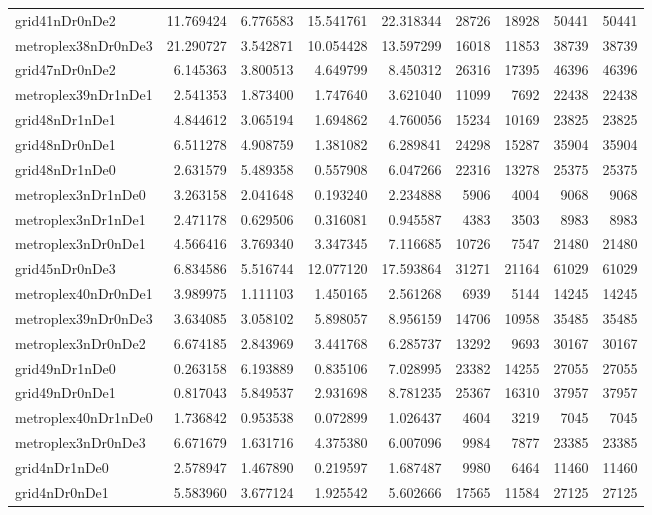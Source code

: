 \begin{longtable}{|l|r|r|r|r|r|r|r|r|}
grid41nDr0nDe2 & 11.769424 & 6.776583 & 15.541761 & 22.318344 & 28726 & 18928 & 50441 & 50441 \\
metroplex38nDr0nDe3 & 21.290727 & 3.542871 & 10.054428 & 13.597299 & 16018 & 11853 & 38739 & 38739 \\
grid47nDr0nDe2 & 6.145363 & 3.800513 & 4.649799 & 8.450312 & 26316 & 17395 & 46396 & 46396 \\
metroplex39nDr1nDe1 & 2.541353 & 1.873400 & 1.747640 & 3.621040 & 11099 & 7692 & 22438 & 22438 \\
grid48nDr1nDe1 & 4.844612 & 3.065194 & 1.694862 & 4.760056 & 15234 & 10169 & 23825 & 23825 \\
grid48nDr0nDe1 & 6.511278 & 4.908759 & 1.381082 & 6.289841 & 24298 & 15287 & 35904 & 35904 \\
grid48nDr1nDe0 & 2.631579 & 5.489358 & 0.557908 & 6.047266 & 22316 & 13278 & 25375 & 25375 \\
metroplex3nDr1nDe0 & 3.263158 & 2.041648 & 0.193240 & 2.234888 & 5906 & 4004 & 9068 & 9068 \\
metroplex3nDr1nDe1 & 2.471178 & 0.629506 & 0.316081 & 0.945587 & 4383 & 3503 & 8983 & 8983 \\
metroplex3nDr0nDe1 & 4.566416 & 3.769340 & 3.347345 & 7.116685 & 10726 & 7547 & 21480 & 21480 \\
grid45nDr0nDe3 & 6.834586 & 5.516744 & 12.077120 & 17.593864 & 31271 & 21164 & 61029 & 61029 \\
metroplex40nDr0nDe1 & 3.989975 & 1.111103 & 1.450165 & 2.561268 & 6939 & 5144 & 14245 & 14245 \\
metroplex39nDr0nDe3 & 3.634085 & 3.058102 & 5.898057 & 8.956159 & 14706 & 10958 & 35485 & 35485 \\
metroplex3nDr0nDe2 & 6.674185 & 2.843969 & 3.441768 & 6.285737 & 13292 & 9693 & 30167 & 30167 \\
grid49nDr1nDe0 & 0.263158 & 6.193889 & 0.835106 & 7.028995 & 23382 & 14255 & 27055 & 27055 \\
grid49nDr0nDe1 & 0.817043 & 5.849537 & 2.931698 & 8.781235 & 25367 & 16310 & 37957 & 37957 \\
metroplex40nDr1nDe0 & 1.736842 & 0.953538 & 0.072899 & 1.026437 & 4604 & 3219 & 7045 & 7045 \\
metroplex3nDr0nDe3 & 6.671679 & 1.631716 & 4.375380 & 6.007096 & 9984 & 7877 & 23385 & 23385 \\
grid4nDr1nDe0 & 2.578947 & 1.467890 & 0.219597 & 1.687487 & 9980 & 6464 & 11460 & 11460 \\
grid4nDr0nDe1 & 5.583960 & 3.677124 & 1.925542 & 5.602666 & 17565 & 11584 & 27125 & 27125 \\

\end{longtable}
